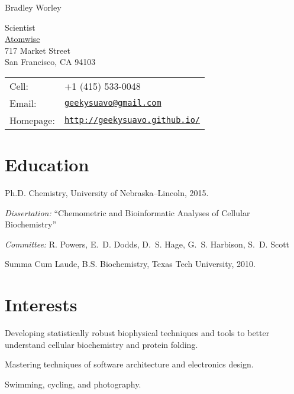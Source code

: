 \documentclass[letterpaper]{article}
\def\name{Bradley Worley}
\renewenvironment{itemize}{
  \begin{list}{}{
    \setlength{\leftmargin}{1.5em}
  }
}{
  \end{list}
}
\begin{document}
{\huge \name}
\vspace{0.25in}

\begin{minipage}{0.45\linewidth}
  Scientist \\
  \href{http://www.atomwise.com/}{Atomwise} \\
  717 Market Street \\
  San Francisco, CA 94103
\end{minipage}
\begin{minipage}{0.45\linewidth}
  \begin{tabular}{ll}
    Cell: &  +1 (415) 533-0048 \\
    Email: & \href{mailto:geekysuavo@gmail.com}
                     {\tt geekysuavo@gmail.com} \\
    Homepage: & \href{http://geekysuavo.github.io/}
                 {\tt http://geekysuavo.github.io/} \\
  \end{tabular}
\end{minipage}


\section*{Education}

\begin{itemize}
  \item Ph.D. Chemistry, University of Nebraska--Lincoln, 2015.
  \begin{itemize}
    \item \emph{Dissertation:} ``Chemometric and Bioinformatic Analyses
      of Cellular Biochemistry''
    \item \emph{Committee:}
      R. Powers, E.~D. Dodds, D.~S. Hage,
      G.~S. Harbison, S.~D. Scott
  \end{itemize}
  \item Summa Cum Laude, B.S. Biochemistry, Texas Tech University, 2010.
\end{itemize}


\section*{Interests}

\begin{itemize}
\item{
  Developing statistically robust biophysical techniques and tools to better
  understand cellular biochemistry and protein folding.
}
\item{
  Mastering techniques of software architecture and electronics design.
}
\item{
  Swimming, cycling, and photography.
}
\end{itemize}
\end{document}
